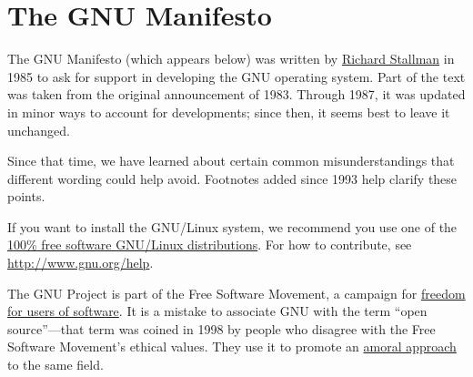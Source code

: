 \chapter{The GNU Manifesto}
The GNU Manifesto (which appears below) was written by \href{http://www.stallman.org/}{Richard Stallman} in 1985 to ask for support in developing the GNU operating system. Part of the text was taken from the original announcement of 1983. Through 1987, it was updated in minor ways to account for developments; since then, it seems best to leave it unchanged.\par
Since that time, we have learned about certain common misunderstandings that different wording could help avoid. Footnotes added since 1993 help clarify these points.\par
If you want to install the GNU/Linux system, we recommend you use one of the \href{http://www.gnu.org/distros/}{100\% free software GNU/Linux distributions}. For how to contribute, see \url{http://www.gnu.org/help}.\par
The GNU Project is part of the Free Software Movement, a campaign for \href{http://www.gnu.org/philosophy/free-sw.html}{freedom for users of software}. It is a mistake to associate GNU with the term “open source”—that term was coined in 1998 by people who disagree with the Free Software Movement's ethical values. They use it to promote an \href{http://www.gnu.org/philosophy/open-source-misses-the-point.html}{amoral approach} to the same field.
